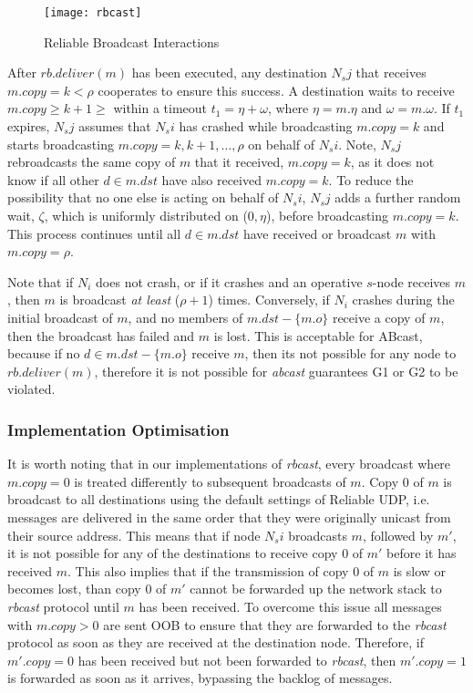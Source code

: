    \begin{figure}[!h] 
        \centering    
         \texttt{[image: rbcast]}
         \caption[Reliable Broadcast Interactions]{Reliable Broadcast Interactions}
         \label{fig:rbcast}
    \end{figure}
    
    After $rb.deliver(m)$ has been executed, any destination $N_sj$ that receives $m.copy = k < \rho$ cooperates to ensure this success.  A destination waits to receive $m.copy \geq k + 1 \geq$ within a timeout $t_1 = \eta + \omega$, where $\eta= m.\eta$ and $\omega=m.\omega$.  If $t_1$ expires, $N_sj$ assumes that $N_si$ has crashed while broadcasting $m.copy = k$ and starts broadcasting $m.copy = k, k+1,\ldots, \rho$ on behalf of $N_si$. Note, $N_sj$ rebroadcasts the same copy of $m$ that it received, $m.copy = k$, as it does not know if all other $d \in m.dst$ have also received $m.copy = k$.  To reduce the possibility that no one else is acting on behalf of $N_si$, $N_sj$ adds a further random wait, $\zeta$, which is uniformly distributed on ($0,\eta$), before broadcasting $m.copy = k$.  This process continues until all $d \in m.dst$ have received or broadcast $m$ with $m.copy = \rho$.  
    
    Note that if $N_i$ does not crash, or if it crashes and an operative $s$-node receives $m$, then $m$ is broadcast \emph{at least} ($\rho + 1$) times.  Conversely, if $N_i$ crashes during the initial broadcast of $m$, and no members of $m.dst - \{m.o\}$ receive a copy of $m$, then the broadcast has failed and $m$ is lost.  This is acceptable for \textsf{ABcast}, because if no $d \in m.dst - \{m.o\}$ receive $m$, then its not possible for any node to $rb.deliver(m)$, therefore it is not possible for \emph{abcast} guarantees G1 or G2 to be violated.  
    
    
    \subsubsection*{Implementation Optimisation}
    It is worth noting that in our implementations of \emph{rbcast}, every broadcast where $m.copy = 0$ is treated differently to subsequent broadcasts of $m$.  Copy 0 of $m$ is broadcast to all destinations using the default settings of Reliable UDP, i.e. messages are delivered in the same order that they were originally unicast from their source address.  This means that if node $N_si$ broadcasts $m$, followed by $m'$, it is not possible for any of the destinations to receive copy $0$ of $m'$ before it has received $m$.  This also implies that if the transmission of copy $0$ of $m$ is slow or becomes lost, than copy $0$ of $m'$ cannot be forwarded up the network stack to \emph{rbcast} protocol until $m$ has been received.  To overcome this issue all messages with $m.copy > 0$ are sent OOB to ensure that they are forwarded to the \emph{rbcast} protocol as soon as they are received at the destination node.  Therefore, if $m'.copy = 0$ has been received but not been forwarded to \emph{rbcast}, then $m'.copy = 1$ is forwarded as soon as it arrives, bypassing the backlog of messages.  
    
